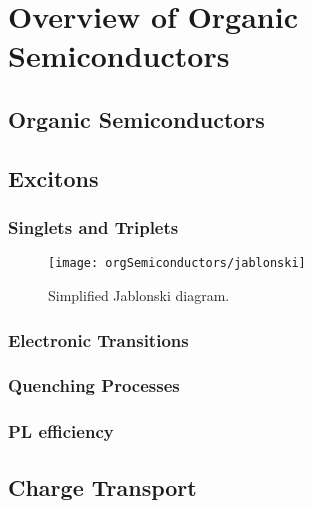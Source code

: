 \documentclass[../thesis.tex]{subfiles}
\begin{document}
\chapter{Overview of Organic Semiconductors}

\section{Organic Semiconductors}

\section{Excitons}\label{sec:excitons}
\subsection{Singlets and Triplets}


\begin{wrapfigure}{r}{.5\textwidth}
\centering
\texttt{[image: orgSemiconductors/jablonski]}
\caption{Simplified Jablonski diagram.}
\label{fig:orgSemi_jablonski}
\end{wrapfigure}


\subsection{Electronic Transitions}
\subsection{Quenching Processes}
\subsection{PL efficiency}

\section{Charge Transport}




\end{document}
